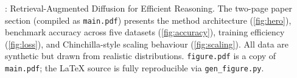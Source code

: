 \caption{\textbf{\methodname}: Retrieval-Augmented Diffusion for Efficient Reasoning.
  The two-page paper section (compiled as \texttt{main.pdf}) presents
  the method architecture (\cref{fig:hero}), benchmark accuracy across five datasets
  (\cref{fig:accuracy}), training efficiency (\cref{fig:loss}), and Chinchilla-style
  scaling behaviour (\cref{fig:scaling}).
  All data are synthetic but drawn from realistic distributions.
  \texttt{figure.pdf} is a copy of \texttt{main.pdf}; the LaTeX source is fully
  reproducible via \texttt{gen\_figure.py}.}
